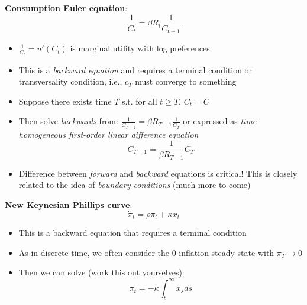 \documentclass[10pt]{beamer}
\begin{document}
\begin{frame}{}
	\textbf{Consumption Euler equation}:
	\begin{equation*}
		\frac{1}{C_t} = \beta R_t\frac{1}{C_{t+1}}
	\end{equation*}
	\begin{itemize}
		\item $\frac{1}{C_t} = u'(C_t)$ is marginal utility with log preferences
		
		\item This is a \textit{backward equation} and requires a terminal condition or transversality condition, i.e., $c_T$ must converge to something
		
		\item Suppose there exists time $T$ s.t. for all $t \geq T$, $C_t = C$
		
		\item Then solve \textit{backwards} from: $\frac{1}{C_{T-1}} = \beta R_{T-1} \frac{1}{C_T}$ or expressed as \textit{time-homogeneous first-order linear difference equation}
		\begin{equation*}
			C_{T-1} = \frac{1}{\beta R_{T-1}} C_T
		\end{equation*}
		
		\item Difference between \textit{forward} and \textit{backward} equations is critical! This is closely related to the idea of \textit{boundary conditions} (much more to come)
	\end{itemize}
\end{frame}



\begin{frame}{}
	\textbf{New Keynesian Phillips curve}:
	\begin{equation*}
		\dot \pi_t = \rho \pi_t + \kappa x_t
	\end{equation*}
	\begin{itemize}
		\item This is a backward equation that requires a terminal condition
		
		\item As in discrete time, we often consider the $0$ inflation steady state with $\pi_T \to 0$
		
		\item Then we can solve (work this out yourselves):
		\begin{equation*}
			\pi_t = - \kappa \int_t^\infty x_s ds
		\end{equation*}
	\end{itemize}
\end{frame}
\end{document}
